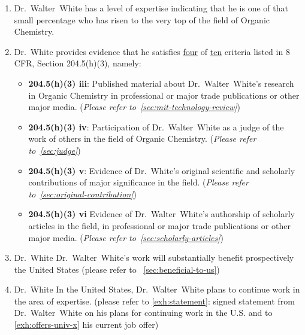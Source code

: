 \documentclass{article}
\newcommand{\fname}{Walter}
\newcommand{\lname}{White}
\newcommand{\dr}{Dr.~\fname~\lname}
\newcommand{\drfn}{Dr.~\lname}
\newcommand{\oc}{Organic Chemistry}
\newcommand{\referto}[1]{(\emph{Please refer to~\cref{#1}})}
\begin{document}
\begin{enumerate}
\item \dr{} has a level of expertise indicating that he is one of that small percentage who has
risen to the very top of the field of \oc.
\item \drfn{} provides evidence that he satisfies \underline{four} of  \underline{ten} criteria listed in 8 CFR, Section 204.5(h)(3), namely:
    \begin{itemize}
        \item \textbf{204.5(h)(3) iii}:
        Published material about \dr's research in \oc{}
        in professional or major trade publications or other major media. \referto{sec:mit-technology-review}
        \item \textbf{204.5(h)(3) iv}: Participation of \dr{} as a judge of the work of others in the field of \oc.
        \referto{sec:judge}
        \item \textbf{204.5(h)(3) v}: Evidence of \drfn's original scientific and scholarly contributions of major
        significance in the field. \referto{sec:original-contribution}
        \item \textbf{204.5(h)(3) vi} Evidence of \dr's authorship of scholarly articles in the field,
        in professional or major trade publications or other major media. \referto{sec:scholarly-articles}
    \end{itemize}


\item \drfn{} \dr's work will substantially benefit prospectively the United States
(please refer to ~\cref{sec:beneficial-to-us})

\item \drfn{} In the United States, \dr{} plans to continue work in the area of expertise.
(please refer to \ref{exh:statement}: signed statement from \dr{}
on his plans for continuing work in the U.S.
and to \ref{exh:offers-univ-x} his current job offer)

\end{enumerate}
\end{document}

